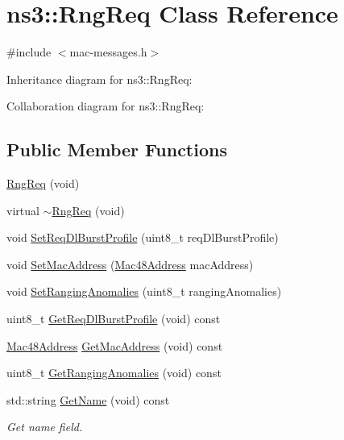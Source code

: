 \hypertarget{classns3_1_1RngReq}{}\section{ns3\+:\+:Rng\+Req Class Reference}
\label{classns3_1_1RngReq}


{\ttfamily \#include $<$mac-\/messages.\+h$>$}



Inheritance diagram for ns3\+:\+:Rng\+Req\+:


Collaboration diagram for ns3\+:\+:Rng\+Req\+:
\subsection*{Public Member Functions}
\begin{DoxyCompactItemize}
\item 
\hyperlink{classns3_1_1RngReq_ab7e343ab92da37858d59793796fe17d3}{Rng\+Req} (void)
\item 
virtual \hyperlink{classns3_1_1RngReq_a62d871f43876219bf41adb88e5650a54}{$\sim$\+Rng\+Req} (void)
\item 
void \hyperlink{classns3_1_1RngReq_a18474f33aefdb93944417fdc949e2b8f}{Set\+Req\+Dl\+Burst\+Profile} (uint8\+\_\+t req\+Dl\+Burst\+Profile)
\item 
void \hyperlink{classns3_1_1RngReq_a7ca0032632d0cc4d56779bf7cd9a67ab}{Set\+Mac\+Address} (\hyperlink{classns3_1_1Mac48Address}{Mac48\+Address} mac\+Address)
\item 
void \hyperlink{classns3_1_1RngReq_a4eef7a7c66363543a5e2f47f297c2a22}{Set\+Ranging\+Anomalies} (uint8\+\_\+t ranging\+Anomalies)
\item 
uint8\+\_\+t \hyperlink{classns3_1_1RngReq_a042b3a85b7589e6badeee55766e94bde}{Get\+Req\+Dl\+Burst\+Profile} (void) const 
\item 
\hyperlink{classns3_1_1Mac48Address}{Mac48\+Address} \hyperlink{classns3_1_1RngReq_aca39e129dd6ab770b2a15da5e2bdd25a}{Get\+Mac\+Address} (void) const 
\item 
uint8\+\_\+t \hyperlink{classns3_1_1RngReq_a20773c8d5a12e31bf8f5567b01fd94ff}{Get\+Ranging\+Anomalies} (void) const 
\item 
std\+::string \hyperlink{classns3_1_1RngReq_ac272329a25a2395e8e52812c686abea5}{Get\+Name} (void) const 
\begin{DoxyCompactList}\small\item\em Get name field. \end{DoxyCompactList}\item 

\end{DoxyCompactItemize}
